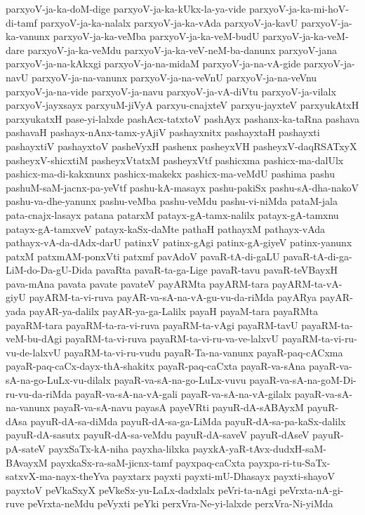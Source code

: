 {parxyoV-ja-ka-doM-dige
parxyoV-ja-ka-kUkx-la-ya-vide
parxyoV-ja-ka-mi-hoV-di-tamf
parxyoV-ja-ka-nalalx
parxyoV-ja-ka-vAda
parxyoV-ja-kavU
parxyoV-ja-ka-vanunx
parxyoV-ja-ka-veMba
parxyoV-ja-ka-veM-budU
parxyoV-ja-ka-veM-dare
parxyoV-ja-ka-veMdu
parxyoV-ja-ka-veV-neM-ba-danunx
parxyoV-jana
parxyoV-ja-na-kAkxgi
parxyoV-ja-na-midaM
parxyoV-ja-na-vA-gide
parxyoV-ja-navU
parxyoV-ja-na-vanunx
parxyoV-ja-na-veVnU
parxyoV-ja-na-veVnu
parxyoV-ja-na-vide
parxyoV-ja-navu
parxyoV-ja-vA-diVtu
parxyoV-ja-vilalx
parxyoV-jayxsayx
parxyuM-jiVyA
parxyu-cnajxteV
parxyu-jayxteV
parxyukAtxH
parxyukatxH
pase-yi-lalxde
pashAcx-tatxtoV
pashAyx
pashanx-ka-taRna
pashava
pashavaH
pashayx-nAnx-tamx-yAjiV
pashayxnitx
pashayxtaH
pashayxti
pashayxtiV
pashayxtoV
pasheVyxH
pashenx
pasheyxVH
pasheyxV-daqRSATxyX
pasheyxV-shicxtiM
pasheyxVtatxM
pasheyxVtf
pashicxma
pashicx-ma-dalUlx
pashicx-ma-di-kakxnunx
pashicx-makekx
pashicx-ma-veMdU
pashima
pashu
pashuM-saM-jacnx-pa-yeVtf
pashu-kA-masayx
pashu-pakiSx
pashu-sA-dha-nakoV
pashu-va-dhe-yanunx
pashu-veMba
pashu-veMdu
pashu-vi-niMda
pataM-jala
pata-cnajx-lasayx
patana
patarxM
patayx-gA-tamx-nalilx
patayx-gA-tamxnu
patayx-gA-tamxveV
patayx-kaSx-daMte
pathaH
pathayxM
pathayx-vAda
pathayx-vA-da-dAdx-darU
patinxV
patinx-gAgi
patinx-gA-giyeV
patinx-yanunx
patxM
patxmAM-ponxVti
patxmf
pavAdoV
pavaR-tA-di-gaLU
pavaR-tA-di-ga-LiM-do-Da-gU-Dida
pavaRta
pavaR-ta-ga-Lige
pavaR-tavu
pavaR-teVBayxH
pava-mAna
pavata
pavate
pavateV
payARMta
payARM-tara
payARM-ta-vA-giyU
payARM-ta-vi-ruva
payAR-va-sA-na-vA-gu-vu-da-riMda
payARya
payAR-yada
payAR-ya-dalilx
payAR-ya-ga-Lalilx
payaH
payaM-tara
payaRMta
payaRM-tara
payaRM-ta-ra-vi-ruva
payaRM-ta-vAgi
payaRM-tavU
payaRM-ta-veM-bu-dAgi
payaRM-ta-vi-ruva
payaRM-ta-vi-ru-va-ve-lalxvU
payaRM-ta-vi-ru-vu-de-lalxvU
payaRM-ta-vi-ru-vudu
payaR-Ta-na-vanunx
payaR-paq-cACxma
payaR-paq-caCx-dayx-thA-shakitx
payaR-paq-caCxta
payaR-va-sAna
payaR-va-sA-na-go-LuLx-vu-dilalx
payaR-va-sA-na-go-LuLx-vuvu
payaR-va-sA-na-goM-Di-ru-vu-da-riMda
payaR-va-sA-na-vA-gali
payaR-va-sA-na-vA-gilalx
payaR-va-sA-na-vanunx
payaR-va-sA-navu
payasA
payeVRti
payuR-dA-sABAyxM
payuR-dAsa
payuR-dA-sa-diMda
payuR-dA-sa-ga-LiMda
payuR-dA-sa-pa-kaSx-dalilx
payuR-dA-sasutx
payuR-dA-sa-veMdu
payuR-dA-saveV
payuR-dAseV
payuR-pA-sateV
payxSaTx-kA-niha
payxha-lilxka
payxkA-yaR-tAvx-dudxH-saM-BAvayxM
payxkaSx-ra-saM-jicnx-tamf
payxpaq-caCxta
payxpa-ri-tu-SaTx-satxvX-ma-nayx-theYva
payxtarx
payxti
payxti-mU-Dhasayx
payxti-shayoV
payxtoV
peVkaSxyX
peVkeSx-yu-LaLx-dadxlalx
peVri-ta-nAgi
peVrxta-nA-gi-ruve
peVrxta-neMdu
peVyxti
peYki
perxVra-Ne-yi-lalxde
perxVra-Ni-yiMda
}
